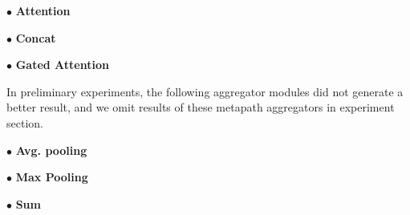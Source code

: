 $\bullet$ \textbf{Attention}

$\bullet$ \textbf{Concat}

$\bullet$ \textbf{Gated Attention}

In preliminary experiments, the following aggregator modules did not generate a better result, and we omit results of these metapath aggregators in experiment section.

$\bullet$ \textbf{Avg. pooling}

$\bullet$ \textbf{Max Pooling}

$\bullet$ \textbf{Sum}








